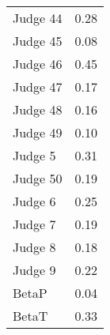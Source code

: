 \begin{tabular}{lr}
 Judge 44 &      0.28 \\
 Judge 45 &      0.08 \\
 Judge 46 &      0.45 \\
 Judge 47 &      0.17 \\
 Judge 48 &      0.16 \\
 Judge 49 &      0.10 \\
  Judge 5 &      0.31 \\
 Judge 50 &      0.19 \\
  Judge 6 &      0.25 \\
  Judge 7 &      0.19 \\
  Judge 8 &      0.18 \\
  Judge 9 &      0.22 \\
    BetaP &      0.04 \\
    BetaT &      0.33 \\
\bottomrule
\end{tabular}
